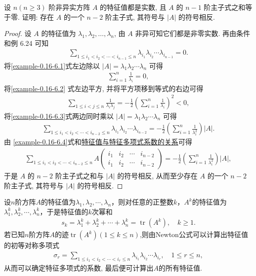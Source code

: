 \documentclass[../../main.tex]{subfiles}
\begin{document}
\begin{example}
设 $n (n \geq 3)$ 阶非异实方阵 $A$ 的特征值都是实数, 且 $A$ 的 $n-1$ 阶主子式之和等于零. 证明: 存在 $A$ 的一个 $n-2$ 阶主子式, 其符号与 $|A|$ 的符号相反.
\end{example}
\begin{proof}
设 $A$ 的特征值为 $\lambda_1, \lambda_2, \dots, \lambda_n$, 由 $A$ 非异可知它们都是非零实数. 再由条件和例 6.24 可知
\begin{align}
\sum_{1 \leq i_1 < i_2 < \cdots < i_{n-1} \leq n} \lambda_{i_1} \lambda_{i_2} \cdots \lambda_{i_{n-1}} = 0.\label{example-0.16-6.1}
\end{align}
将\eqref{example-0.16-6.1}式左边除以 $|A| = \lambda_1 \lambda_2 \cdots \lambda_n$ 可得
\begin{align}
\sum_{i=1}^n \frac{1}{\lambda_i} = 0, \label{example-0.16-6.2}
\end{align}
将\eqref{example-0.16-6.2} 式左边平方, 并将平方项移到等式的右边可得
\begin{align}
\sum_{1 \leq i < j \leq n} \frac{1}{\lambda_i \lambda_j} = -\frac{1}{2} \left( \sum_{i=1}^n \frac{1}{\lambda_i} \right)^2 < 0, \label{example-0.16-6.3}
\end{align}
将\eqref{example-0.16-6.3}式两边同时乘以 $|A| = \lambda_1 \lambda_2 \cdots \lambda_n$ 可得
\begin{align}
\sum_{1 \leq i_1 < i_2 < \cdots < i_{n-2} \leq n} \lambda_{i_1} \lambda_{i_2} \cdots \lambda_{i_{n-2}} = -\frac{1}{2} \left( \sum_{i=1}^n \frac{1}{\lambda_i^2} \right) |A|. \label{example-0.16-6.4}
\end{align}
由 \eqref{example-0.16-6.4}式和\hyperref[proposition:特征值与特征多项式系数的关系]{特征值与特征多项式系数的关系}可得
\begin{align*}
\sum_{1 \leq i_1 < i_2 < \cdots < i_{n-2} \leq n} A \begin{pmatrix}
i_1 & i_2 & \cdots & i_{n-2} \\
i_1 & i_2 & \cdots & i_{n-2}
\end{pmatrix} = -\frac{1}{2} \left( \sum_{i=1}^n \frac{1}{\lambda_i^2} \right) |A|,
\end{align*}
于是 $A$ 的 $n-2$ 阶主子式之和与 $|A|$ 的符号相反, 从而至少存在 $A$ 的一个 $n-2$ 阶主子式, 其符号与 $|A|$ 的符号相反. 
\end{proof}

\begin{conclusion}
设$n$阶方阵$A$的特征值为$\lambda_1, \lambda_2, \cdots, \lambda_n$，则对任意的正整数$k$，$A^k$的特征值为$\lambda_1^k, \lambda_2^k, \cdots, \lambda_n^k$，于是特征值的$k$次幂和
\begin{align*}
s_k = \lambda_1^k + \lambda_2^k + \cdots + \lambda_n^k = \operatorname{tr}(A^k), \quad k \geq 1.
\end{align*}
若已知$n$阶方阵$A$的迹$\operatorname{tr}(A^k)(1\leq k \leq n)$,则由Newton公式可以计算出特征值的初等对称多项式
\begin{align*}
\sigma_r = \sum_{1 \leq i_1 < i_2 < \cdots < i_r \leq n} \lambda_{i_1} \lambda_{i_2} \cdots \lambda_{i_r}, \quad 1 \leq r \leq n,
\end{align*}
从而可以确定特征多项式的系数, 最后便可计算出$A$的所有特征值.
\end{conclusion}
\end{document}
